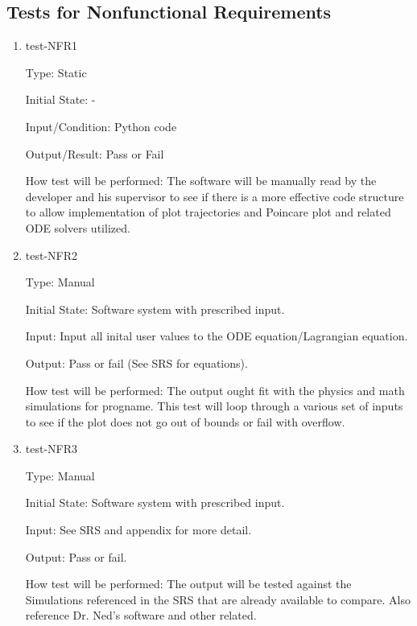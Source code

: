 \documentclass[12pt, titlepage]{article}
\begin{document}

\subsection{Tests for Nonfunctional Requirements}

\begin{enumerate}

\item{test-NFR1\\}

Type: Static
					
Initial State: -
					
Input/Condition: \progname Python code
					
Output/Result: Pass or Fail
					
How test will be performed: The software will be manually read by the developer 
and his supervisor to see if there is a more effective code structure to allow 
implementation of plot trajectories and Poincare plot and related ODE solvers
utilized.  

\item{test-NFR2\\} 

Type: Manual 

Initial State: Software system with prescribed input.

Input: Input all inital user values to the ODE equation/Lagrangian equation.

Output: Pass or fail (See SRS for equations).

How test will be performed: The output ought fit with the physics and math simulations for
progname. This test will loop through a various set of inputs to see if the plot does not 
go out of bounds or fail with overflow.

\item{test-NFR3\\} 

Type: Manual 

Initial State: Software system with prescribed input.

Input: See SRS and appendix for more detail.

Output: Pass or fail.

How test will be performed: The output will be tested against the Simulations
referenced in the SRS that are already available to compare. Also reference
Dr. Ned's software and other related. \\ 

\end{enumerate}
\end{document}
